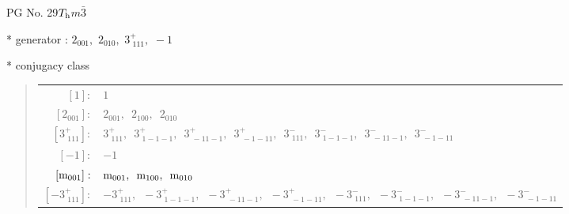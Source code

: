 \documentclass[fleqn,8pt]{jsarticle}
\begin{document}
\setcounter{MaxMatrixCols}{32}

\renewcommand{\tablename}{Table~}
\renewcommand{\figurename}{Figure~}
\begin{center}
\LARGE
PG No. 29\quad$T_{\rm h}$\quad$m\bar{3}$\quad[ cubic ]
\end{center}

* generator : $2{}_{001},\,\,2{}_{010},\,\,3^{+}_{\,\,111},\,\,-1$

* conjugacy class
\begin{quote}
\begin{tabular}{rl}
$ [1]: $ & $ 1 $ \\
$ [2{}_{001}]: $ & $ 2{}_{001},\,\,\,2{}_{100},\,\,\,2{}_{010} $ \\
$ [3^{+}_{\,\,111}]: $ & $ 3^{+}_{\,\,111},\,\,\,3^{+}_{\,\,1-1-1},\,\,\,3^{+}_{\,\,-11-1},\,\,\,3^{+}_{\,\,-1-11},\,\,\,3^{-}_{\,\,111},\,\,\,3^{-}_{\,\,1-1-1},\,\,\,3^{-}_{\,\,-11-1},\,\,\,3^{-}_{\,\,-1-11} $ \\
$ [-1]: $ & $ -1 $ \\
$ [{\rm m}_{001}]: $ & $ {\rm m}_{001},\,\,\,{\rm m}_{100},\,\,\,{\rm m}_{010} $ \\
$ [-3^{+}_{\,\,111}]: $ & $ -3^{+}_{\,\,111},\,\,\,-3^{+}_{\,\,1-1-1},\,\,\,-3^{+}_{\,\,-11-1},\,\,\,-3^{+}_{\,\,-1-11},\,\,\,-3^{-}_{\,\,111},\,\,\,-3^{-}_{\,\,1-1-1},\,\,\,-3^{-}_{\,\,-11-1},\,\,\,-3^{-}_{\,\,-1-11} $
\end{tabular}
\end{quote}
\end{document}

